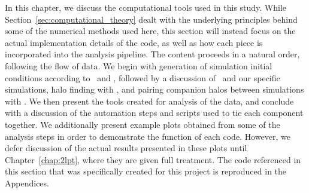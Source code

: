 
%
%
%
%


In this chapter, we discuss the computational tools used in this study.  While Section~\ref{sec:computational_theory} dealt with the underlying principles behind some of the numerical methods used here, this section will instead focus on the actual implementation details of the code, as well as how each piece is incorporated into the analysis pipeline.  The content proceeds in a natural order, following the flow of data.  We begin with generation of simulation initial conditions according to \za\ and \lpt, followed by a discussion of \gadgettwo\ and our specific simulations, halo finding with \rockstar, and pairing companion halos between simulations with \crossmatch.  We then present the tools created for analysis of the data, and conclude with a discussion of the automation steps and scripts used to tie each component together.  We additionally present example plots obtained from some of the analysis steps in order to demonstrate the function of each code.  However, we defer discussion of the actual results presented in these plots until Chapter~\ref{chap:2lpt}, where they are given full treatment.  The code referenced in this section that was specifically created for this project is reproduced in the Appendices.




